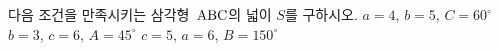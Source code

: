 다음 조건을 만족시키는 삼각형~$\mathrm{ABC}$의 넓이 $S$를 구하시오.
 $a=4$, $b=5$, $C=60^\circ$
 $b=3$, $c=6$, $A=45^\circ$
 $c=5$, $a=6$, $B=150^\circ$
